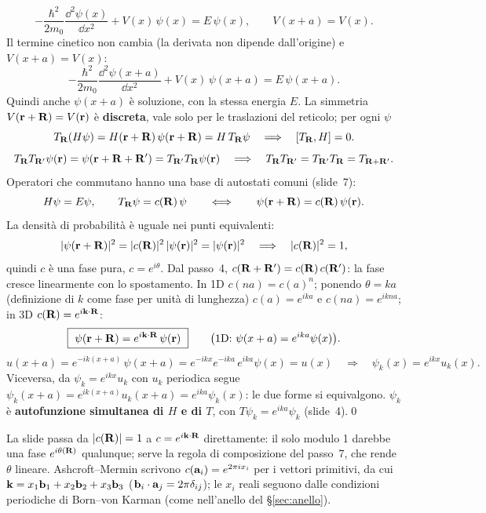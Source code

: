 \documentclass[11pt,a4paper]{article}
\begin{document}
\begin{dimostrazione}
\[
-\frac{\hbar^2}{2m_0}\frac{\dd^2\psi(x)}{\dd x^2}+V(x)\,\psi(x)=E\,\psi(x),\qquad V(x+a)=V(x).
\]
Il termine cinetico non cambia (la derivata non dipende dall'origine) e $V(x+a)=V(x)$:
\[
-\frac{\hbar^2}{2m_0}\frac{\dd^2\psi(x+a)}{\dd x^2}+V(x)\,\psi(x+a)=E\,\psi(x+a).
\]
Quindi anche $\psi(x+a)$ è soluzione, con la stessa energia $E$.
La simmetria $V(\mathbf r+\mathbf R)=V(\mathbf r)$ è \textbf{discreta}, vale solo per le traslazioni del reticolo; per ogni $\psi$
\[
T_{\mathbf R}(H\psi)=H(\mathbf r+\mathbf R)\,\psi(\mathbf r+\mathbf R)=H\,T_{\mathbf R}\psi\quad\Longrightarrow\quad[T_{\mathbf R},H]=0.
\]
\[
T_{\mathbf R}T_{\mathbf R'}\psi(\mathbf r)=\psi(\mathbf r+\mathbf R+\mathbf R')=T_{\mathbf R'}T_{\mathbf R}\psi(\mathbf r)\quad\Longrightarrow\quad T_{\mathbf R}T_{\mathbf R'}=T_{\mathbf R'}T_{\mathbf R}=T_{\mathbf R+\mathbf R'}.
\]
Operatori che commutano hanno una base di autostati comuni (slide~7):
\[
H\psi=E\psi,\qquad T_{\mathbf R}\psi=c(\mathbf R)\,\psi\qquad\Longleftrightarrow\qquad\psi(\mathbf r+\mathbf R)=c(\mathbf R)\,\psi(\mathbf r).
\]
La densità di probabilità è uguale nei punti equivalenti:
\[
|\psi(\mathbf r+\mathbf R)|^2=|c(\mathbf R)|^2\,|\psi(\mathbf r)|^2=|\psi(\mathbf r)|^2\quad\Longrightarrow\quad|c(\mathbf R)|^2=1,
\]
quindi $c$ è una fase pura, $c=e^{i\theta}$.
Dal passo~4, $c(\mathbf R+\mathbf R')=c(\mathbf R)\,c(\mathbf R')$: la fase cresce linearmente con lo spostamento. In 1D $c(na)=c(a)^n$; ponendo $\theta=ka$ (definizione di $k$
come fase per unità di lunghezza) $c(a)=e^{ika}$ e $c(na)=e^{ikna}$; in 3D $c(\mathbf R)=e^{i\mathbf k\cdot\mathbf R}$:
\[
\boxed{\ \psi(\vr+\vR)=e^{i\vk\cdot\vR}\,\psi(\vr)\ }\qquad\bigl(\text{1D: }\psi(x+a)=e^{ika}\psi(x)\bigr).
\]
\[
u(x+a)=e^{-ik(x+a)}\,\psi(x+a)=e^{-ikx}e^{-ika}\,e^{ika}\psi(x)=u(x)\quad\Longrightarrow\quad\psi_k(x)=e^{ikx}u_k(x).
\]
Viceversa, da $\psi_k=e^{ikx}u_k$ con $u_k$ periodica segue $\psi_k(x+a)=e^{ik(x+a)}u_k(x+a)=e^{ika}\psi_k(x)$: le due forme si equivalgono.
$\psi_k$ è \textbf{autofunzione simultanea di $H$ e di $T$}, con $T\psi_k=e^{ika}\psi_k$ (slide~4).\qed
\end{dimostrazione}

\begin{approfondimento}[da $|c|=1$ a $c=e^{i\vk\cdot\vR}$]
La slide passa da $|c(\mathbf R)|=1$ a $c=e^{i\vk\cdot\vR}$ direttamente: il solo modulo 1 darebbe una fase $e^{i\theta(\mathbf R)}$ qualunque; serve la regola di
composizione del passo~7, che rende $\theta$ lineare. Ashcroft--Mermin scrivono $c(\mathbf a_i)=e^{2\pi ix_i}$ per i vettori primitivi, da cui
$\mathbf k=x_1\mathbf b_1+x_2\mathbf b_2+x_3\mathbf b_3$ ($\mathbf b_i\cdot\mathbf a_j=2\pi\delta_{ij}$); le $x_i$ reali seguono dalle condizioni periodiche di Born--von Karman (come
nell'anello del §\ref{sec:anello}).
\end{approfondimento}
\end{document}
